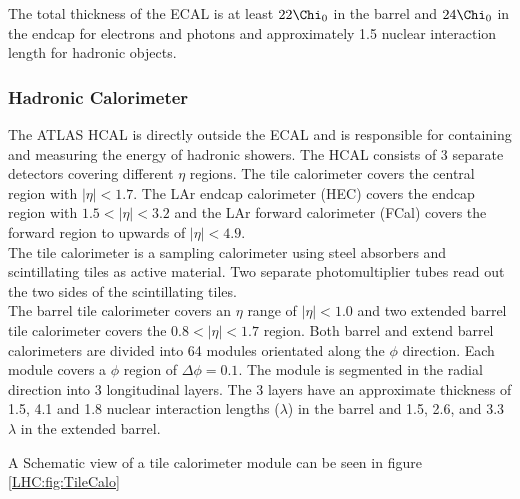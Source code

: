 \indent The total thickness of the ECAL is at least $22 \Chi_0$ in the barrel and $24 \Chi_0$ in the endcap for electrons and photons and approximately 1.5 nuclear interaction length for hadronic objects. \\

\subsubsection*{Hadronic Calorimeter}

\indent The ATLAS HCAL is directly outside the ECAL and is responsible for containing and measuring the energy of hadronic showers.  The HCAL consists of 3 separate detectors covering different $\eta$ regions. The tile calorimeter covers the central region with $|\eta| < 1.7$.  The LAr endcap calorimeter (HEC) covers the endcap region with $1.5<|\eta| < 3.2$ and the LAr forward calorimeter (FCal) covers the forward region to upwards of $|\eta| < 4.9$.  \\

\indent The tile calorimeter is a sampling calorimeter using steel absorbers and scintillating tiles as active material. Two separate photomultiplier tubes read out the two sides of the scintillating tiles.  \\

\indent The barrel tile calorimeter covers an $\eta$ range of $|\eta| < 1.0$ and two extended barrel tile calorimeter covers the $0.8 < |\eta| < 1.7$ region.  Both barrel and extend barrel calorimeters are divided into 64 modules orientated along the $\phi$ direction.  Each module covers a $\phi$ region of $\Delta\phi = 0.1$.  The module is segmented in the radial direction into 3 longitudinal layers.  The 3 layers have an approximate thickness of 1.5, 4.1 and 1.8 nuclear interaction lengths ($\lambda$) in the barrel and 1.5, 2.6, and 3.3 $\lambda$ in the extended barrel.  

\indent A Schematic view of a tile calorimeter module can be seen in figure \ref{LHC:fig:TileCalo}

